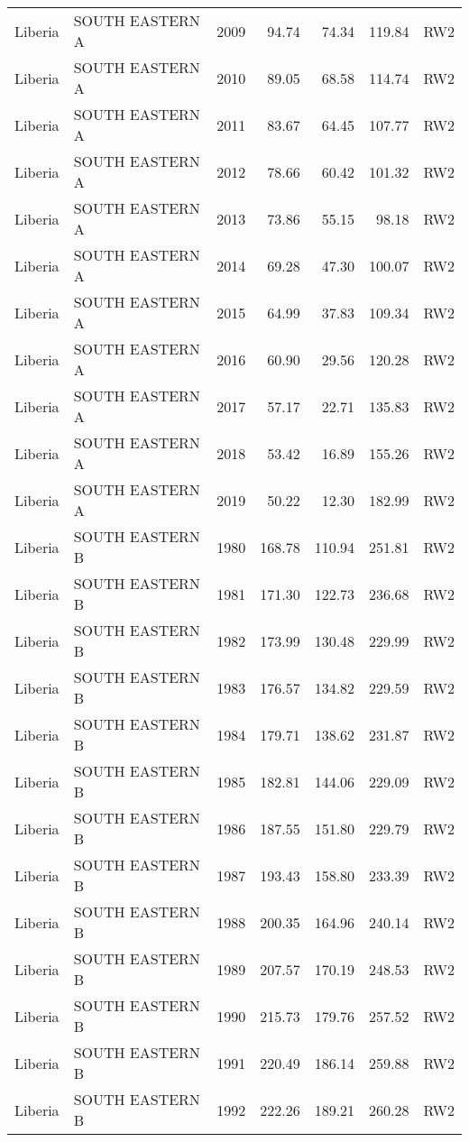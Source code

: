 \begin{longtable}{lllrrrl}
  Liberia & SOUTH EASTERN A & 2009 & 94.74 & 74.34 & 119.84 & RW2 \\ 
  Liberia & SOUTH EASTERN A & 2010 & 89.05 & 68.58 & 114.74 & RW2 \\ 
  Liberia & SOUTH EASTERN A & 2011 & 83.67 & 64.45 & 107.77 & RW2 \\ 
  Liberia & SOUTH EASTERN A & 2012 & 78.66 & 60.42 & 101.32 & RW2 \\ 
  Liberia & SOUTH EASTERN A & 2013 & 73.86 & 55.15 & 98.18 & RW2 \\ 
  Liberia & SOUTH EASTERN A & 2014 & 69.28 & 47.30 & 100.07 & RW2 \\ 
  Liberia & SOUTH EASTERN A & 2015 & 64.99 & 37.83 & 109.34 & RW2 \\ 
  Liberia & SOUTH EASTERN A & 2016 & 60.90 & 29.56 & 120.28 & RW2 \\ 
  Liberia & SOUTH EASTERN A & 2017 & 57.17 & 22.71 & 135.83 & RW2 \\ 
  Liberia & SOUTH EASTERN A & 2018 & 53.42 & 16.89 & 155.26 & RW2 \\ 
  Liberia & SOUTH EASTERN A & 2019 & 50.22 & 12.30 & 182.99 & RW2 \\ 
  Liberia & SOUTH EASTERN B & 1980 & 168.78 & 110.94 & 251.81 & RW2 \\ 
  Liberia & SOUTH EASTERN B & 1981 & 171.30 & 122.73 & 236.68 & RW2 \\ 
  Liberia & SOUTH EASTERN B & 1982 & 173.99 & 130.48 & 229.99 & RW2 \\ 
  Liberia & SOUTH EASTERN B & 1983 & 176.57 & 134.82 & 229.59 & RW2 \\ 
  Liberia & SOUTH EASTERN B & 1984 & 179.71 & 138.62 & 231.87 & RW2 \\ 
  Liberia & SOUTH EASTERN B & 1985 & 182.81 & 144.06 & 229.09 & RW2 \\ 
  Liberia & SOUTH EASTERN B & 1986 & 187.55 & 151.80 & 229.79 & RW2 \\ 
  Liberia & SOUTH EASTERN B & 1987 & 193.43 & 158.80 & 233.39 & RW2 \\ 
  Liberia & SOUTH EASTERN B & 1988 & 200.35 & 164.96 & 240.14 & RW2 \\ 
  Liberia & SOUTH EASTERN B & 1989 & 207.57 & 170.19 & 248.53 & RW2 \\ 
  Liberia & SOUTH EASTERN B & 1990 & 215.73 & 179.76 & 257.52 & RW2 \\ 
  Liberia & SOUTH EASTERN B & 1991 & 220.49 & 186.14 & 259.88 & RW2 \\ 
  Liberia & SOUTH EASTERN B & 1992 & 222.26 & 189.21 & 260.28 & RW2 \\ 

\end{longtable}
